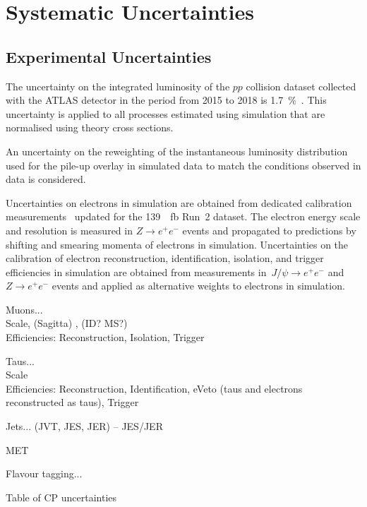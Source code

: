 \section{Systematic Uncertainties}
\label{sec:uncertainties}

\subsection{Experimental Uncertainties}

The uncertainty on the integrated luminosity of the $pp$ collision
dataset collected with the ATLAS detector in the period from 2015 to
2018 is \SI{1.7}{\percent}~\cite{ATLAS-CONF-2019-021}. This
uncertainty is applied to all processes estimated using simulation
that are normalised using theory cross sections.

An uncertainty on the reweighting of the instantaneous luminosity
distribution used for the pile-up overlay in simulated data to match
the conditions observed in data is considered.

Uncertainties on electrons in simulation are obtained from dedicated
calibration measurements~\cite{EGAM-2018-01,TRIG-2018-05} updated for
the \SI{139}{\per\femto\barn} Run~2 dataset. The electron energy scale
and resolution is measured in $Z \to e^+e^-$ events and propagated to
predictions by shifting and smearing momenta of electrons in
simulation. Uncertainties on the calibration of electron
reconstruction, identification, isolation, and trigger efficiencies in
simulation are obtained from measurements in~$J/\psi \to e^+e^-$ and
$Z \to e^+e^-$ events and applied as alternative weights to electrons
in simulation.

Muons... \cite{MUON-2018-03} \\
Scale, (Sagitta) , (ID? MS?) \\
Efficiencies: Reconstruction, Isolation, Trigger

Taus... \\
Scale \\
Efficiencies: Reconstruction, Identification, eVeto (taus and
electrons reconstructed as taus), Trigger

Jets... (JVT, JES, JER) -- JES/JER \cite{JETM-2018-05}

MET

Flavour tagging... \cite{FTAG-2018-01}

\begin{table}[htbp]
  \centering

  

  \caption{Table of CP uncertainties}
  \label{tab:bla}
\end{table}


